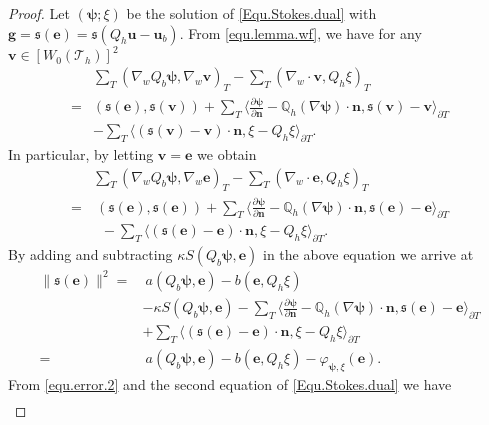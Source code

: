 \documentclass[final,leqno]{siamltex704}
\def\S{{\mathfrak s}}
\def\T{{\mathcal T}}
\begin{document}
\begin{proof}
Let $(\bm{\psi};\xi)$ be the solution of \eqref{Equ.Stokes.dual} with $\bm{g}=\S(\bm{e})=\S(Q_h\bm{u}-\bm{u}_b)$.
From \eqref{equ.lemma.wf}, we have for any $\bm{v} \in [W_0(\T_h)]^2$
\begin{equation}\label{equ.lemma.wf.EE.1}
\begin{split}
& \sum_{T}(\nabla_w Q_b \bm{\psi},\nabla_w \bm{v})_T - \sum_{T}(\nabla_w\cdot\bm{v}, Q_h \xi )_{T}\\
= &(\S(\bm{e}), \S(\bm{v})) + \sum_{T}\langle \frac{\partial \bm{\psi}}{\partial \bm{n}}- \mathbb{Q}_h(\nabla \bm{\psi})\cdot\bm{n},\S(\bm{v})-\bm{v}\rangle_{\partial T}\\
& - \sum_{T} \langle (\S(\bm{v})-\bm{v})\cdot \bm{n},\xi - Q_h \xi\rangle_{\partial T}.
\end{split}
\end{equation}
In particular, by letting $\bm{v} =\bm{e}$ we obtain
\begin{equation*}
\begin{split}
& \sum_{T}(\nabla_w Q_b \bm{\psi},\nabla_w \bm{e})_T - \sum_{T}(\nabla_w\cdot\bm{e}, Q_h \xi )_{T}\\
= &\ (\S(\bm{e}), \S(\bm{e})) + \sum_{T}\langle \frac{\partial \bm{\psi}}{\partial \bm{n}}- \mathbb{Q}_h(\nabla \bm{\psi})\cdot\bm{n},\S(\bm{e})-\bm{e}\rangle_{\partial T}\\
& \; \; - \sum_{T} \langle (\S(\bm{e})-\bm{e})\cdot \bm{n},\xi - Q_h \xi\rangle_{\partial T}.
\end{split}
\end{equation*}
By adding and subtracting $\kappa {S}(Q_b\bm{\psi},\bm{e})$ in the above equation we arrive at
\begin{equation}\label{EQ:July01:002}
\begin{split}
 \|\S(\bm{e})\|^2 =&\ a(Q_b \bm{\psi},\bm{e}) -b(\bm{e},Q_h \xi) \\
&- \kappa {S}(Q_b\bm{\psi},\bm{e})- \sum_{T}\langle \frac{\partial \bm{\psi}}{\partial \bm{n}}- \mathbb{Q}_h(\nabla \bm{\psi})\cdot\bm{n},\S(\bm{e})-\bm{e}\rangle_{\partial T}\\
& + \sum_{T} \langle (\S(\bm{e})-\bm{e})\cdot \bm{n},\xi - Q_h \xi\rangle_{\partial T} \\
=&\ a(Q_b \bm{\psi},\bm{e}) -b(\bm{e},Q_h \xi) -\varphi_{\bm{\psi},\xi}(\bm{e}).
\end{split}
\end{equation}
From \eqref{equ.error.2} and the second equation of \eqref{Equ.Stokes.dual} we have
\begin{eqnarray}

\end{eqnarray}
\end{proof}
\end{document}
